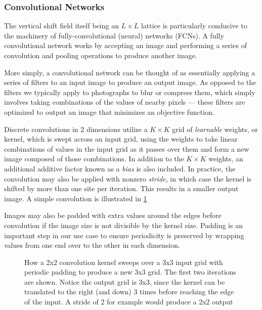 \documentclass[12pt]{article}
\begin{document}
\subsubsection{Convolutional Networks}

The vertical shift field itself being an $L \times L$ lattice is particularly conducive to the machinery of fully-convolutional (neural)
networks (FCNs). A fully convolutional network works by accepting an image and performing a series of convolution and pooling operations
to produce another image. 

More simply, a convolutional network can be thought of as essentially applying a series of filters to an input image to produce an output image. As
opposed to the filters we typically apply to photographs to blur or compress them, which simply involves taking combinations of the values of nearby
pixels --- these filters are optimized to output an image that minimizes an objective function. 

Discrete convolutions in 2 dimensions utilize a $K\times K$ grid of \textit{learnable} weights, or kernel, which is swept across an input grid, using the weights to take linear combinations of values 
in the input grid as it passes over them and form a new image composed of those combinations. 
In addition to the $K\times K$ weights, an additional additive factor known as a \textit{bias} is also included. In practice, the convolution
may also be applied with nonzero \textit{stride}, in which case the kernel is shifted by more than one site per iteration. This results in a smaller output image.
A simple convolution is illustrated in \ref{fig:conv2d}

Images may also be padded with extra values around the edges before convolution if the image size is not divisible by the kernel size. Padding 
is an important step in our use case to ensure periodicity is preserved by wrapping values from one end over to the other in each dimension.

\begin{figure}[h]
	\begin{center}
	
	\end{center}
	\caption[Convolution Demonstration]{How a 2x2 convolution kernel sweeps over a 3x3 input grid with periodic padding to produce a new 3x3 grid. The first two iterations are shown.
	Notice the output grid is 3x3, since the kernel can be translated to the right (and down) 3 times before reaching the edge of the input.
	A stride of 2 for example would produce a 2x2 output}
	\label{fig:conv2d}
\end{figure}
\end{document}
